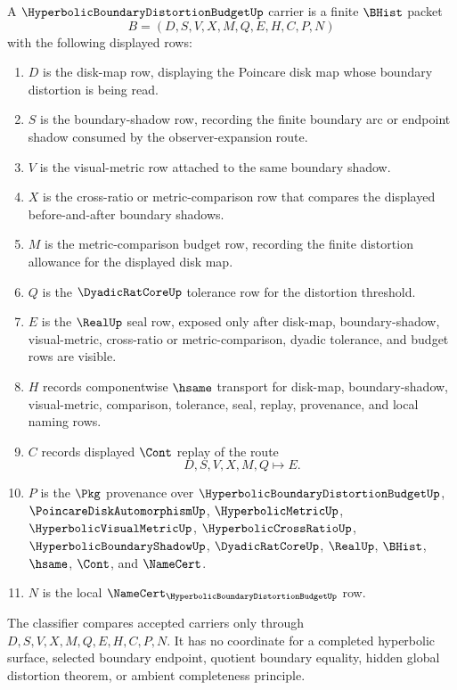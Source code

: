 \begin{definition}
\label{def:hyperbolic-boundary-distortion-budget-carrier}
A $\HyperbolicBoundaryDistortionBudgetUp$ carrier is a finite $\BHist$ packet
$$
B=(D,S,V,X,M,Q,E,H,C,P,N)
$$
with the following displayed rows:
\begin{enumerate}
\item $D$ is the disk-map row, displaying the Poincare disk map whose boundary distortion is being read.
\item $S$ is the boundary-shadow row, recording the finite boundary arc or endpoint shadow consumed by the observer-expansion route.
\item $V$ is the visual-metric row attached to the same boundary shadow.
\item $X$ is the cross-ratio or metric-comparison row that compares the displayed before-and-after boundary shadows.
\item $M$ is the metric-comparison budget row, recording the finite distortion allowance for the displayed disk map.
\item $Q$ is the $\DyadicRatCoreUp$ tolerance row for the distortion threshold.
\item $E$ is the $\RealUp$ seal row, exposed only after disk-map, boundary-shadow, visual-metric, cross-ratio or metric-comparison, dyadic tolerance, and budget rows are visible.
\item $H$ records componentwise $\hsame$ transport for disk-map, boundary-shadow, visual-metric, comparison, tolerance, seal, replay, provenance, and local naming rows.
\item $C$ records displayed $\Cont$ replay of the route
$$
D,S,V,X,M,Q \longmapsto E .
$$
\item $P$ is the $\Pkg$ provenance over $\HyperbolicBoundaryDistortionBudgetUp$, $\PoincareDiskAutomorphismUp$, $\HyperbolicMetricUp$, $\HyperbolicVisualMetricUp$, $\HyperbolicCrossRatioUp$, $\HyperbolicBoundaryShadowUp$, $\DyadicRatCoreUp$, $\RealUp$, $\BHist$, $\hsame$, $\Cont$, and $\NameCert$.
\item $N$ is the local $\NameCert_{\HyperbolicBoundaryDistortionBudgetUp}$ row.
\end{enumerate}
The classifier compares accepted carriers only through $D,S,V,X,M,Q,E,H,C,P,N$. It has no coordinate for a completed hyperbolic surface, selected boundary endpoint, quotient boundary equality, hidden global distortion theorem, or ambient completeness principle.
\end{definition}

